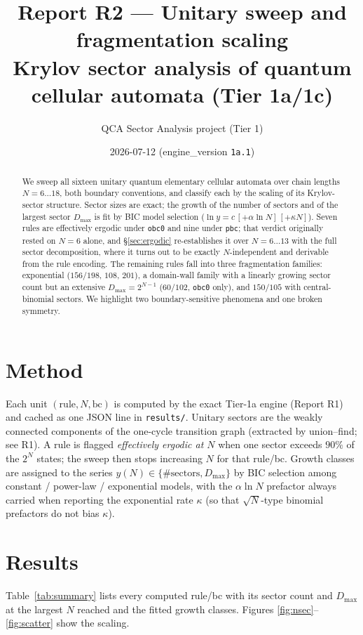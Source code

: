\documentclass[11pt]{article}
\title{\textbf{Report R2 --- Unitary sweep and fragmentation scaling}\\
\large Krylov sector analysis of quantum cellular automata (Tier 1a/1c)}
\author{QCA Sector Analysis project (Tier 1)}
\date{2026-07-12 \quad\small(engine\_version \texttt{1a.1})}
\newcommand{\rt}[1]{\texttt{#1}}
\begin{document}
\maketitle

\begin{abstract}
We sweep all sixteen unitary quantum elementary cellular automata over chain
lengths $N=6\ldots18$, both boundary conventions, and classify each by the
scaling of its Krylov-sector structure. Sector sizes are exact; the growth of
the number of sectors and of the largest sector $D_{\max}$ is fit by BIC model
selection ($\ln y=c\,[+\alpha\ln N]\,[+\kappa N]$). Seven rules are effectively
ergodic under \rt{obc0} and nine under \rt{pbc}; that verdict originally rested
on $N=6$ alone, and \S\ref{sec:ergodic} re-establishes it over $N=6\ldots13$ with
the full sector decomposition, where it turns out to be exactly $N$-independent
and derivable from the rule encoding. The remaining rules fall into three
fragmentation families: exponential ($156/198$, $108$, $201$), a
domain-wall family with a linearly growing sector count but an extensive
$D_{\max}=2^{N-1}$ ($60/102$, \rt{obc0} only), and $150/105$ with central-binomial
sectors. We highlight two boundary-sensitive phenomena and one broken symmetry.
\end{abstract}

\section{Method}
Each unit $(\text{rule},N,\text{bc})$ is computed by the exact Tier-1a engine
(Report R1) and cached as one JSON line in \rt{results/}. Unitary sectors are the
weakly connected components of the one-cycle transition graph (extracted by
union--find; see R1). A rule is flagged \emph{effectively ergodic at $N$} when one
sector exceeds $90\%$ of the $2^N$ states; the sweep then stops increasing $N$ for
that rule/bc. Growth classes are assigned to the series $y(N)\in\{\#\text{sectors},
D_{\max}\}$ by BIC selection among constant / power-law / exponential models, with
the $\alpha\ln N$ prefactor always carried when reporting the exponential rate
$\kappa$ (so that $\sqrt N$-type binomial prefactors do not bias $\kappa$).

\section{Results}
Table~\ref{tab:summary} lists every computed rule/bc with its sector count and
$D_{\max}$ at the largest $N$ reached and the fitted growth classes. Figures
\ref{fig:nsec}--\ref{fig:scatter} show the scaling.
\end{document}
